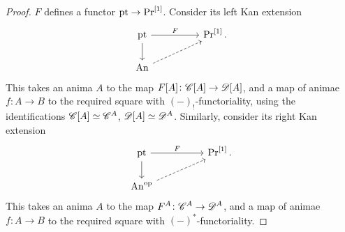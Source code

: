 \documentclass[english,svgnames,table]{article}
\begin{document}
    \begin{proof}
        $F$ defines a functor $\mathrm{pt} \to \operatorname{Pr}^{[1]}$. Consider its left Kan extension
        \begin{equation*}
            \begin{tikzcd}
                \pt && {\Pr^{[1]}.} \\
                {\An}
                \arrow["F", from=1-1, to=1-3]
                \arrow[from=1-1, to=2-1]
                \arrow[dashed, from=2-1, to=1-3]
            \end{tikzcd}
        \end{equation*}
        This takes an anima $A$ to the map $F[A] \colon \mathscr{C}[A] \to \mathscr{D}[A]$, and a map of animae $f \colon A \to B$ to the required square with $(-)_!$-functoriality, using the identifications $\mathscr{C}[A] \simeq \mathscr{C}^A$, $\mathscr{D}[A] \simeq \mathscr{D}^A$.
        Similarly, consider its right Kan extension
        \begin{equation*}
            \begin{tikzcd}
                \pt && {\Pr^{[1]}.} \\
                {\An\op}
                \arrow["F", from=1-1, to=1-3]
                \arrow[from=1-1, to=2-1]
                \arrow[dashed, from=2-1, to=1-3]
            \end{tikzcd}
        \end{equation*}
        This takes an anima $A$ to the map $F^A \colon \mathscr{C}^A \to \mathscr{D}^A$, and a map of animae $f \colon A \to B$ to the required square with $(-)^*$-functoriality.
    \end{proof}
\end{document}
